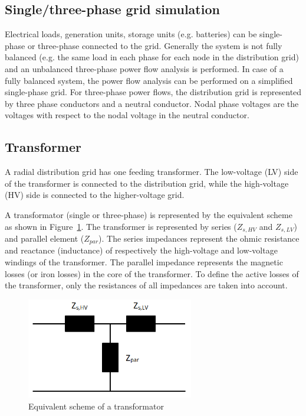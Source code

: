 \subsection{Single/three-phase grid simulation}
Electrical loads, generation units, storage units (e.g. batteries) can be single-phase or three-phase connected to the grid. Generally the system is not fully balanced (e.g. the same load in each phase for each node in the distribution grid) and an unbalanced three-phase power flow analysis is performed. In case of a fully balanced system, the power flow analysis can be performed on a simplified single-phase grid. For three-phase power flows, the distribution grid is represented by three phase conductors and a neutral conductor. Nodal phase voltages are the voltages with respect to the nodal voltage in the neutral conductor.

\subsection{Transformer}
A radial distribution grid has one feeding transformer. The low-voltage (LV) side of the transformer is connected to the distribution grid, while the high-voltage (HV) side is connected to the higher-voltage grid.

A transformator (single or three-phase) is represented by the equivalent scheme as shown in Figure~\ref{figTrafo}. The transformer is represented by series ($Z_{s,HV}$ and $Z_{s,LV}$) and parallel element ($Z_{par}$). The series impedances represent the ohmic resistance and reactance (inductance) of respectively the high-voltage and low-voltage windings of the transformer. The parallel impedance represents the magnetic losses (or iron losses) in the core of the transformer. To define the active losses of the transformer, only the resistances of all impedances are taken into account.

\begin{figure}[ht]
\centerline{\includegraphics[width=0.65\textwidth, angle=0]{Electric/MyGraphics/trafo_equischeme.png}}
\caption{Equivalent scheme of a transformator}
\label{figTrafo}
\end{figure}

